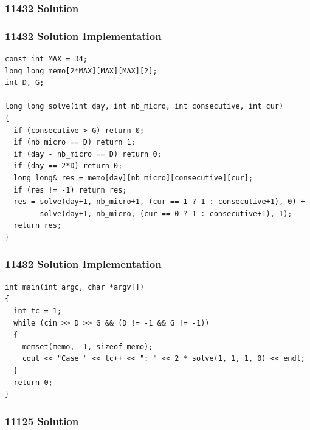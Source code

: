 \documentclass{beamer}
\newcommand{\uvalink}[2]{UVa Online Judge (http://uva.onlinejudge.org)
  problem number \href{#2}{\textcolor{blue}{#1}.}}
\newcounter{exo}
\newcommand{\exo}{
  \addtocounter{exo}{1}
  Exercice \arabic{exo}
}
\begin{document}
\ifanswers

\begin{frame}%
\frametitle{11432 Solution}

\end{frame}

\begin{frame}[fragile]
\frametitle{11432 Solution Implementation}

\scriptsize
\begin{lstlisting}
const int MAX = 34;
long long memo[2*MAX][MAX][MAX][2];
int D, G;

long long solve(int day, int nb_micro, int consecutive, int cur)
{
  if (consecutive > G) return 0;
  if (nb_micro == D) return 1;
  if (day - nb_micro == D) return 0;
  if (day == 2*D) return 0;
  long long& res = memo[day][nb_micro][consecutive][cur];
  if (res != -1) return res;
  res = solve(day+1, nb_micro+1, (cur == 1 ? 1 : consecutive+1), 0) +
        solve(day+1, nb_micro, (cur == 0 ? 1 : consecutive+1), 1);
  return res;
}
\end{lstlisting}

\end{frame}

\begin{frame}[fragile]
\frametitle{11432 Solution Implementation}

\scriptsize
\begin{lstlisting}
int main(int argc, char *argv[])
{
  int tc = 1;
  while (cin >> D >> G && (D != -1 && G != -1))
  {
    memset(memo, -1, sizeof memo);
    cout << "Case " << tc++ << ": " << 2 * solve(1, 1, 1, 0) << endl;
  }
  return 0;
}
\end{lstlisting}

\end{frame}

\fi


\ifanswers

\begin{frame}%
\frametitle{11125 Solution}

\end{frame}
\end{document}
